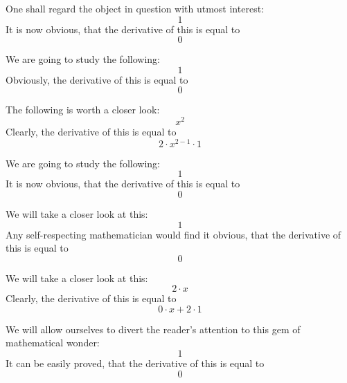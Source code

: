 \documentclass{article}
\begin{document}
One shall regard the object in question with utmost interest:
\begin{equation}
1 
\end{equation}
It is now obvious, that the derivative of this is equal to
\begin{equation}
0 
\end{equation}

We are going to study the following:
\begin{equation}
1 
\end{equation}
Obviously, the derivative of this is equal to
\begin{equation}
0 
\end{equation}

The following is worth a closer look:
\begin{equation}
x ^{2 } 
\end{equation}
Clearly, the derivative of this is equal to
\begin{equation}
2 \cdot x ^{2 - 1 } \cdot 1 
\end{equation}

We are going to study the following:
\begin{equation}
1 
\end{equation}
It is now obvious, that the derivative of this is equal to
\begin{equation}
0 
\end{equation}

We will take a closer look at this:
\begin{equation}
1 
\end{equation}
Any self-respecting mathematician would find it obvious, that the derivative of this is equal to
\begin{equation}
0 
\end{equation}

We will take a closer look at this:
\begin{equation}
2 \cdot x 
\end{equation}
Clearly, the derivative of this is equal to
\begin{equation}
0 \cdot x + 2 \cdot 1 
\end{equation}

We will allow ourselves to divert the reader's attention to this gem of mathematical wonder:
\begin{equation}
1 
\end{equation}
It can be easily proved, that the derivative of this is equal to
\begin{equation}
0 
\end{equation}
\end{document}
